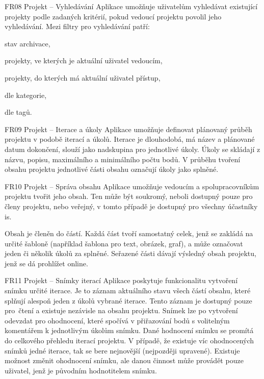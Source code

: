 \begin{dl}
   \item[FR08 Projekt -- Vyhledávání]
   Aplikace umožňuje uživatelům vyhledávat existující projekty podle zadaných kritérií, pokud vedoucí projektu povolil jeho vyhledávání. Mezi filtry pro vyhledávání patří: 

   \begin{ulnar}
      \item stav archivace, 
      \item projekty, ve kterých je aktuální uživatel vedoucím, 
      \item projekty, do kterých má aktuální uživatel přístup, 
      \item dle kategorie, 
      \item dle tagů.
   \end{ulnar}
   

   \item[FR09 Projekt -- Iterace a úkoly]
   Aplikace umožňuje definovat plánovaný průběh projektu v podobě iterací a úkolů. Iterace je dlouhodobá, má název a plánované datum dokončení, slouží jako nadskupina pro jednotlivé úkoly. Úkoly se skládají z názvu, popisu, maximálního a minimálního počtu bodů. V průběhu tvoření obsahu projektu jednotlivé části obsahu označují úkoly jako splněné.

   \item[FR10 Projekt -- Správa obsahu]
   Aplikace umožňuje vedoucím a spolupracovníkům projektu tvořit jeho obsah. Ten může být soukromý, neboli dostupný pouze pro členy projektu, nebo veřejný, v tomto případě je dostupný pro všechny účastníky \gls{is}.

   Obsah je členěn do částí. Každá část tvoří samostatný celek, jenž se zakládá na určité šabloně (například šablona pro text, obrázek, graf), a může označovat jeden či několik úkolů za splněné. Seřazené části dávají výsledný obsah projektu, jenž se dá prohlížet online.

   \item[FR11 Projekt -- Snímky iterací]
   Aplikace poskytuje funkcionalitu vytvoření snímku určité iterace. Je to záznam aktuálního stavu všech částí obsahu, které splňují alespoň jeden z úkolů vybrané iterace. Tento záznam je dostupný pouze pro~čtení a existuje nezávisle na obsahu projektu. Snímek lze po vytvoření odevzdat pro ohodnocení, které spočívá v přiřazování bodů s volitelným komentářem k jednotlivým úkolům snímku. Dané hodnocení snímku se promítá do celkového přehledu iterací projektu. V případě, že existuje víc ohodnocených snímků jedné iterace, tak se bere nejnovější (nejpozději upravené). Existuje možnost změnit ohodnocení snímku, ale danou činnost může provádět pouze uživatel, jenž je původním hodnotitelem snímku.


\end{dl}
